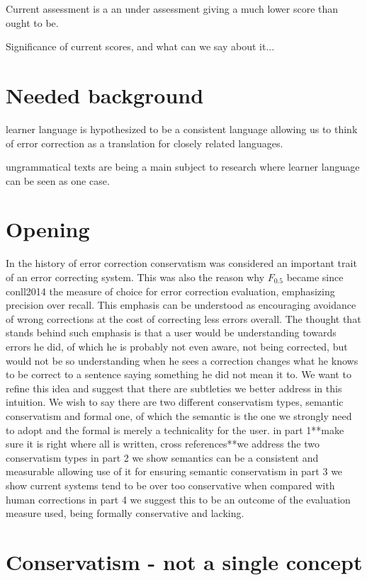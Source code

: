 \documentclass[english]{article}
\begin{document}
Current assessment is a an under assessment giving a much lower score
than ought to be.

Significance of current scores, and what can we say about it...

\section{Needed background}

learner language is hypothesized to be a consistent language allowing
us to think of error correction as a translation for closely related
languages.

ungrammatical texts are being a main subject to research where learner
language can be seen as one case.

\section{Opening}

In the history of error correction conservatism was considered an
important trait of an error correcting system\cite{brockett2006correcting}.
This was also the reason why $F_{0.5}$ became since conll2014\cite{ng2014conll}
the measure of choice for error correction evaluation, emphasizing
precision over recall. This emphasis can be understood as encouraging
avoidance of wrong corrections at the cost of correcting less errors
overall. The thought that stands behind such emphasis is that a user
would be understanding towards errors he did, of which he is probably
not even aware, not being corrected, but would not be so understanding
when he sees a correction changes what he knows to be correct to a
sentence saying something he did not mean it to. We want to refine
this idea and suggest that there are subtleties we better address
in this intuition. We wish to say there are two different conservatism
types, semantic conservatism and formal one, of which the semantic
is the one we strongly need to adopt and the formal is merely a technicality
for the user. in part 1{*}{*}make sure it is right where all is written,
cross references{*}{*}we address the two conservatism types in part
2 we show semantics can be a consistent and measurable allowing use
of it for ensuring semantic conservatism in part 3 we show current
systems tend to be over too conservative when compared with human
corrections in part 4 we suggest this to be an outcome of the evaluation
measure used, being formally conservative and lacking.

\section{Conservatism - not a single concept}
\end{document}
